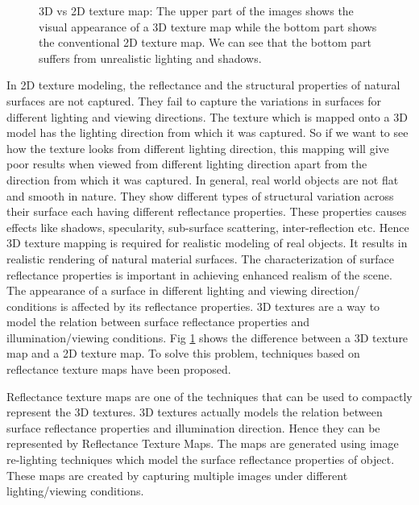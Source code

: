 \begin{figure}[t]
\centering
{} \caption{3D vs 2D texture map:
The upper part of the images shows the visual appearance of
a 3D texture map while the bottom part shows the conventional 2D texture map. 
We can see that the bottom part suffers from unrealistic lighting and shadows.
} \label{fig:map}
\end{figure}
In 2D texture modeling, the reflectance and the structural properties of natural surfaces
are not captured. They fail to capture the variations in surfaces for different lighting and
viewing directions. The texture which is mapped onto a 3D model has
the lighting direction from which it was captured. So if we want to see how the texture looks from
different lighting direction, this mapping will give poor results when viewed from different
lighting direction apart from the direction from which it was captured. In general, real world objects
are not flat and smooth in nature. They show different types of structural variation across their
surface each having different reflectance properties. These properties causes effects like shadows,
specularity, sub-surface scattering, inter-reflection etc. Hence 3D texture mapping
is required for realistic modeling of real objects.
It results in realistic rendering
of natural material surfaces. The characterization of surface reflectance properties is important in
achieving enhanced realism of the scene. The appearance of a surface in different lighting and viewing direction/
conditions is affected by its reflectance properties.
3D textures are a way to model the relation between surface reflectance
properties and illumination/viewing conditions. 
Fig \ref{fig:map} shows the difference between a 3D texture map and a 2D texture map.
To solve this
problem,
techniques based on reflectance texture maps have been proposed. 

Reflectance texture maps are one of
the techniques that can be used to compactly represent the 3D textures.
3D textures actually models the relation
between surface reflectance properties and illumination direction. Hence they can be represented
by Reflectance Texture Maps. The maps are generated using image re-lighting techniques
which model the surface reflectance properties of object. These
maps are created by capturing multiple images under different lighting/viewing conditions.

